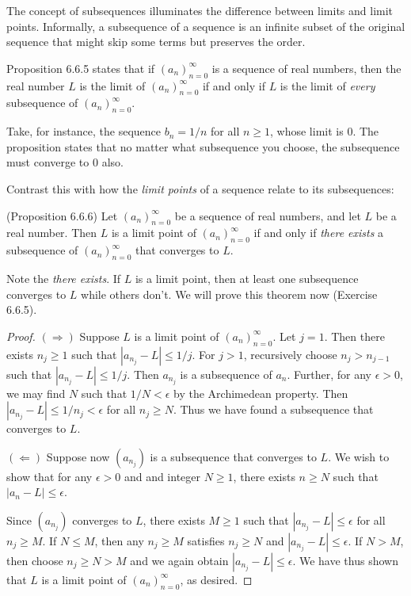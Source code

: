 \documentclass{article}
\begin{document}
The concept of subsequences illuminates the difference between limits and limit points. Informally, a subsequence of a sequence is an infinite subset of the original sequence that might skip some terms but preserves the order.

Proposition 6.6.5 states that if $(a_n)_{n=0}^\infty$ is a sequence of real numbers, then the real number $L$ is the limit of $(a_n)_{n=0}^\infty$ if and only if $L$ is the limit of \textit{every} subsequence of $(a_n)_{n=0}^\infty$. 

Take, for instance, the sequence $b_n = 1/n$ for all $n \geq 1$, whose limit is $0$. The proposition states that no matter what subsequence you choose, the subsequence must converge to $0$ also.

Contrast this with how the \textit{limit points} of a sequence relate to its subsequences: 

(Proposition 6.6.6) Let $(a_n)_{n=0}^\infty$ be a sequence of real numbers, and let $L$ be a real number. Then $L$ is a limit point of $(a_n)_{n=0}^\infty$ if and only if \textit{there exists} a subsequence of $(a_n)_{n=0}^\infty$ that converges to $L$.

Note the \textit{there exists}. If $L$ is a limit point, then at least one subsequence converges to $L$ while others don't. We will prove this theorem now (Exercise 6.6.5).

\begin{proof} 
$(\Rightarrow)$ Suppose $L$ is a limit point of $(a_n)_{n=0}^\infty$. Let $j = 1$. Then there exists $n_j \geq 1$ such that $|a_{n_j} - L| \leq 1/j$. For $j > 1$, recursively choose $n_j > n_{j-1}$ such that $|a_{n_j} - L| \leq 1/j$. Then $a_{n_j}$ is a subsequence of $a_n$. Further, for any $\epsilon > 0$, we may find $N$ such that $1/N < \epsilon$ by the Archimedean property. Then $|a_{n_j} - L| \leq 1/n_j < \epsilon$ for all $n_j \geq N$. Thus we have found a subsequence that converges to $L$.

$(\Leftarrow)$ Suppose now $(a_{n_j})$ is a subsequence that converges to $L$. We wish to show that for any $\epsilon > 0$ and and integer $N \geq 1$, there exists $n \geq N$ such that $|a_n - L | \leq \epsilon$. 

Since $(a_{n_j})$ converges to $L$, there exists $M \geq 1$ such that $|a_{n_j} - L| \leq \epsilon$ for all $n_j \geq M$. If $N \leq M$, then any $n_j \geq M$ satisfies $n_j \geq N$ and $|a_{n_j} - L| \leq \epsilon$. If $N > M$, then choose $n_j \geq N > M$ and we again obtain $|a_{n_j} - L| \leq \epsilon$. We have thus shown that $L$ is a limit point of $(a_n)_{n=0}^\infty$, as desired.
\end{proof}
\end{document}
